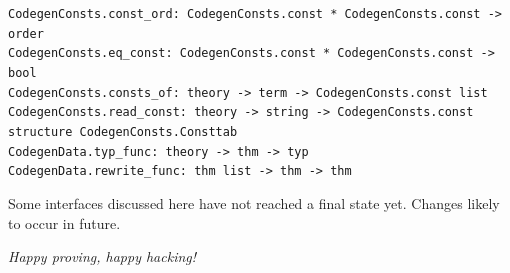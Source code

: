 \begin{isabellebody}
\begin{isamarkuptext}
\begin{description}
  \end{description}%
\end{isamarkuptext}%
\isamarkuptrue%
%
\endisatagmlref
{\isafoldmlref}%
%
\isadelimmlref
%
\endisadelimmlref
%
\isamarkuptrue%
%
\isadelimmlref
%
\endisadelimmlref
%
\isatagmlref
%
\begin{isamarkuptext}%
\begin{mldecls}
  \verb|CodegenConsts.const_ord: CodegenConsts.const * CodegenConsts.const -> order| \\
  \verb|CodegenConsts.eq_const: CodegenConsts.const * CodegenConsts.const -> bool| \\
  \verb|CodegenConsts.consts_of: theory -> term -> CodegenConsts.const list| \\
  \verb|CodegenConsts.read_const: theory -> string -> CodegenConsts.const| \\
  \verb|structure CodegenConsts.Consttab| \\
  \verb|CodegenData.typ_func: theory -> thm -> typ| \\
  \verb|CodegenData.rewrite_func: thm list -> thm -> thm| \\
  \end{mldecls}%
\end{isamarkuptext}%
\isamarkuptrue%
%
\endisatagmlref
{\isafoldmlref}%
%
\isadelimmlref
%
\endisadelimmlref
%
\isamarkuptrue%
%
\begin{isamarkuptext}%
\begin{warn}
    Some interfaces discussed here have not reached
    a final state yet.
    Changes likely to occur in future.
  \end{warn}%
\end{isamarkuptext}%
\isamarkuptrue%
%
\isamarkuptrue%
%
\isamarkuptrue%
%
\begin{isamarkuptext}%
\emph{Happy proving, happy hacking!}%
\end{isamarkuptext}%
\isamarkuptrue%
%
\isadelimtheory
%
\endisadelimtheory
%
\isatagtheory
{}\isamarkupfalse%
%
\endisatagtheory
{\isafoldtheory}%
%
\isadelimtheory
%
\endisadelimtheory
\isanewline
\end{isabellebody}%
